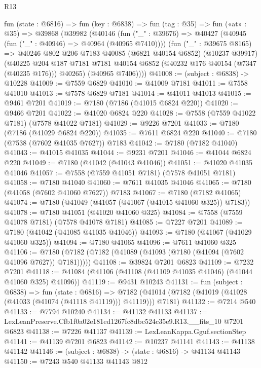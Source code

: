 \begin{lexlean}{R13}
\begin{coremodule}
  fun (state : @6816) =>
  fun (key : @6838) =>
  fun (tag : @35) =>
  fun («at» : @35) =>
  @39868
    (@39982
      (@40146
        (fun ("_" : @39676) => @40427 (@40945 (fun ("_" : @40946) => @40964 (@40965 @7410))))
        (fun ("_" : @39675 @8165) =>
        @40246
          @802
          @206
          @7183
          @40085
          (@6821 @40154 @6852)
          (@10237 @39917)
          (@40225
            @204
            @187
            @7181
            @7181
            @40154
            @6852
            (@40232 @176 @40154 (@7347 (@40235 @176)))
            @40265)
          (@40965 @7406))))
@41008 := (subject : @6838) -> @10228
@41009 := @7559 @6829
@41010 := @41009 @7181
@41011 := @7558 @41010
@41013 := @7578 @6829 @7181
@41014 := @41011 @41013
@41015 := @9461 @7201
@41019 := @7180 (@7186 (@41015 @6824 @220))
@41020 := @9466 @7201
@41022 := @41020 @6824 @220
@41028 := @7558 (@7559 @41022 @7181) (@7578 @41022 @7181)
@41029 := @9226 @7201
@41033 := @7180 (@7186 (@41029 @6824 @220))
@41035 := @7611 @6824 @220
@41040 := @7180 (@7538 (@7602 @41035 @7627)) @7183
@41042 := @7180 (@7182 @41040)
@41043 := @41015 @41035
@41044 := @9231 @7201
@41046 := @41044 @6824 @220
@41049 := @7180 (@41042 (@41043 @41046))
@41051 := @41020 @41035 @41046
@41057 := @7558 (@7559 @41051 @7181) (@7578 @41051 @7181)
@41058 := @7180 @41040
@41060 := @7611 @41035 @41046
@41065 := @7180 (@41058 (@7602 @41060 @7627)) @7183
@41067 := @7180 (@7182 @41065)
@41074 := @7180 (@41049 (@41057 (@41067 (@41015 @41060 @325)) @7183))
@41078 := @7180 @41051 (@41020 @41060 @325)
@41084 := @7558 (@7559 @41078 @7181) (@7578 @41078 @7181)
@41085 := @7227 @7201
@41089 := @7180 (@41042 (@41085 @41035 @41046))
@41093 := @7180 (@41067 (@41029 @41060 @325))
@41094 := @7180 @41065
@41096 := @7611 @41060 @325
@41106 := @7180 (@7182 (@7182 (@41089 (@41093 (@7180 (@41094 (@7602 @41096 @7627)) @7181)))))
@41108 := @39824 @7201 @6823
@41109 := @7232 @7201
@41118 := @41084 (@41106 (@41108 (@41109 @41035 @41046) (@41044 @41060 @325) @41096))
@41119 := @9431 @10243
@41131 := fun (subject : @6838) =>
  fun (state : @6816) =>
  @7182 (@41014 (@7182 (@41019 (@41028 (@41033 (@41074 (@41118 @41119))) @41119))) @7181)
@41132 := @7214 @540
@41133 := @7794 @10240
@41134 := @41132 @41133
@41137 := LexLeanPreserve.Cfb1f0a02e181ed1267fc8dbc524c35e9.R13.__fits_10 @7201 @6823
@41138 := @7226 @41137
@41139 := LexLeanKappa.Gguf.sectionStep
@41141 := @41139 @7201 @6823
@41142 := @10237 @41141
@41143 := @41138 @41142
@41146 := (subject : @6838) -> (state : @6816) -> @41134 @41143
@41150 := @7243 @540 @41133 @41143 @812

\end{coremodule}
\end{lexlean}

